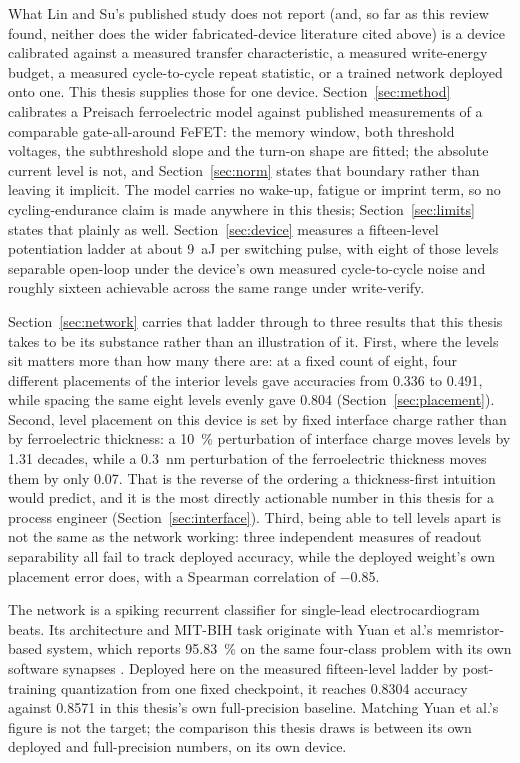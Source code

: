 What Lin and Su's published study does not report (and, so far as this review found,
neither does the wider fabricated-device literature cited above) is a device
calibrated against a measured transfer characteristic, a measured write-energy
budget, a measured cycle-to-cycle repeat statistic, or a trained network deployed
onto one. This thesis supplies those for one device. Section~\ref{sec:method}
calibrates a Preisach ferroelectric model against published measurements of a
comparable gate-all-around FeFET: the memory window, both threshold voltages, the
subthreshold slope and the turn-on shape are fitted; the absolute current level is
not, and Section~\ref{sec:norm} states that boundary rather than leaving it implicit.
The model carries no wake-up, fatigue or imprint term, so no cycling-endurance claim
is made anywhere in this thesis; Section~\ref{sec:limits} states that plainly as
well. Section~\ref{sec:device} measures a fifteen-level potentiation ladder at about
\SI{9}{\atto\joule} per switching pulse, with eight of those levels separable
open-loop under the device's own measured cycle-to-cycle noise and roughly sixteen
achievable across the same range under write-verify.

Section~\ref{sec:network} carries that ladder through to three results that this
thesis takes to be its substance rather than an illustration of it. First, where the
levels sit matters more than how many there are: at a fixed count of eight, four
different placements of the interior levels gave accuracies from \num{0.336} to
\num{0.491}, while spacing the same eight levels evenly gave \num{0.804}
(Section~\ref{sec:placement}). Second, level placement on this device is set by
fixed interface charge rather than by ferroelectric thickness: a \SI{10}{\percent}
perturbation of interface charge moves levels by \num{1.31} decades, while a
\SI{0.3}{\nano\metre} perturbation of the ferroelectric thickness moves them by only
\num{0.07}. That is the reverse of the ordering a thickness-first intuition would
predict, and it is the most directly actionable number in this thesis for a process
engineer (Section~\ref{sec:interface}). Third, being able to tell levels apart is
not the same as the network working: three independent measures of readout
separability all fail to track deployed accuracy, while the deployed weight's own
placement error does, with a Spearman correlation of \num{-0.85}.

The network is a spiking recurrent classifier for single-lead electrocardiogram
beats. Its architecture and MIT-BIH task originate with Yuan et al.'s
memristor-based system, which reports \SI{95.83}{\percent} on the same four-class
problem with its own software synapses \cite{Yuan2023_NatComm}. Deployed here on the
measured fifteen-level ladder by post-training quantization from one fixed
checkpoint, it reaches \num{0.8304} accuracy against \num{0.8571} in this thesis's
own full-precision baseline. Matching Yuan et al.'s figure is not the target; the
comparison this thesis draws is between its own deployed and full-precision numbers,
on its own device.


